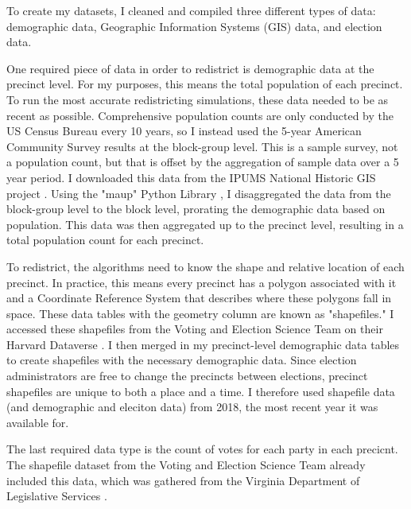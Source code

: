 To create my datasets, I cleaned and compiled three different types of data: demographic data, Geographic Information Systems (GIS) data, and election data.

One required piece of data in order to redistrict is demographic data at the precinct level. For my purposes, this means the total population of each precinct. To run the most accurate redistricting simulations, these data needed to be as recent as possible. Comprehensive population counts are only conducted by the US Census Bureau every 10 years, so I instead used the 5-year American Community Survey results at the block-group level. This is a sample survey, not a population count, but that is offset by the aggregation of sample data over a 5 year period. I downloaded this data from the IPUMS National Historic GIS project \parencite{mansonsteven2020}. Using the "maup" Python Library \parencite{hully}, I disaggregated the data from the block-group level to the block level, prorating the demographic data based on population. This data was then aggregated up to the precinct level, resulting in a total population count for each precinct.

To redistrict, the algorithms need to know the shape and relative location of each precinct. In practice, this means every precinct has a polygon associated with it and a Coordinate Reference System that describes where these polygons fall in space. These data tables with the geometry column are known as "shapefiles." I accessed these shapefiles from the Voting and Election Science Team on their Harvard Dataverse \parencite{votingandelectionscienceteam2019c}. I then merged in my precinct-level demographic data tables to create shapefiles with the necessary demographic data. Since election administrators are free to change the precincts between elections, precinct shapefiles are unique to both a place and a time. I therefore used shapefile data (and demographic and eleciton data) from 2018, the most recent year it was available for.

The last required data type is the count of votes for each party in each precicnt. The shapefile dataset from the Voting and Election Science Team already included this data, which was gathered from the Virginia Department of Legislative Services \parencite{votingandelectionscienceteam2019c}.